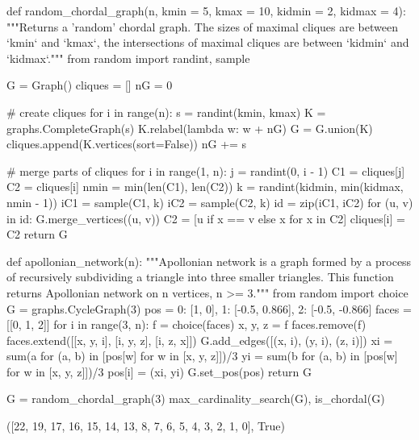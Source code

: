 \begin{sageCell}
def random_chordal_graph(n, kmin = 5, kmax = 10, kidmin = 2, kidmax = 4):
    """Returns a 'random' chordal graph.
    The sizes of maximal cliques are between `kmin` and `kmax`,
    the intersections of maximal cliques are between `kidmin` and `kidmax`."""
    from random import randint, sample

    G = Graph()
    cliques = []
    nG = 0

    # create cliques
    for i in range(n):
        s = randint(kmin, kmax)
        K = graphs.CompleteGraph(s)
        K.relabel(lambda w: w + nG)
        G = G.union(K)
        cliques.append(K.vertices(sort=False))
        nG += s

    # merge parts of cliques
    for i in range(1, n):
        j = randint(0, i - 1)
        C1 = cliques[j]
        C2 = cliques[i]
        nmin = min(len(C1), len(C2))
        k = randint(kidmin, min(kidmax, nmin - 1))
        iC1 = sample(C1, k)
        iC2 = sample(C2, k)
        id = zip(iC1, iC2)
        for (u, v) in id:
            G.merge_vertices((u, v))
            C2 = [u if x == v else x for x in C2]
        cliques[i] = C2
    return G
\end{sageCell}

\begin{sageCell}
    def apollonian_network(n):
    """Apollonian network is a graph formed by a process of recursively subdividing a triangle
    into three smaller triangles. This function returns Apollonian network on n vertices, n >= 3."""
    from random import choice
    G = graphs.CycleGraph(3)
    pos = {0: [1, 0], 1: [-0.5, 0.866], 2: [-0.5, -0.866]}
    faces = [[0, 1, 2]]
    for i in range(3, n):
        f = choice(faces)
        x, y, z = f
        faces.remove(f)
        faces.extend([[x, y, i], [i, y, z], [i, z, x]])
        G.add_edges([(x, i), (y, i), (z, i)])
        xi = sum(a for (a, b) in [pos[w] for w in [x, y, z]])/3
        yi = sum(b for (a, b) in [pos[w] for w in [x, y, z]])/3
        pos[i] = (xi, yi)
    G.set_pos(pos)
    return G
\end{sageCell}

\begin{sageCell}
    G = random_chordal_graph(3)
    max_cardinality_search(G), is_chordal(G)
\end{sageCell}
\begin{outCell}
    ([22, 19, 17, 16, 15, 14, 13, 8, 7, 6, 5, 4, 3, 2, 1, 0], True)
\end{outCell}

